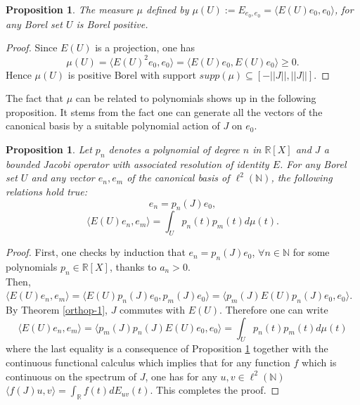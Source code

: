 \documentclass[a4paper]{jpconf}
\numberwithin{equation}{section}
\newtheorem{proposition}[Theorem]{Proposition}
\theoremstyle{nonumberplain}
\newtheorem{proof}{Proof}
\begin{document}
\begin{proposition}\label{measure-proba}
The measure $\mu$ defined by $\mu(U):=E_{e_0,e_0}=\langle E(U)e_0,e_0 \rangle$, for any Borel set $U$ is Borel positive.
\end{proposition}
\begin{proof}
Since $E(U)$ is a projection, one has 
\begin{equation}
\mu(U)=\langle E(U)^2e_0,e_0  \rangle=\langle E(U)e_0,E(U)e_0\rangle\ge0. 
\end{equation}
Hence $\mu(U)$ is positive Borel with support $supp(\mu)\subseteq[-||J||,||J||]$. 
\end{proof}
The fact that $\mu$ can be related to polynomials shows up in the following proposition. It stems from the fact one can generate all the vectors of the canonical basis by a suitable polynomial action of $J$ on $e_0$.
\begin{proposition}\label{matrixelem-spectral-meas}
Let $p_n$ denotes a polynomial of degree $n$ in $\mathbb{R}[X]$ and $J$ a bounded Jacobi operator with associated resolution of identity $E$. For any Borel set $U$ and any vector $e_n,e_m$ of the canonical basis of $\ell^2(\mathbb{N})$, the following relations hold true:
\begin{equation}
e_n=p_n(J)e_0,
\end{equation}
\begin{equation}
\langle E(U)e_n,e_m \rangle=\int_{U}p_n(t)p_m(t)d\mu(t).
\end{equation}
\end{proposition}
\begin{proof}
First, one checks by induction that $e_n=p_n(J)e_0$, $\forall n\in\mathbb{N}$ for some polynomials $p_n\in\mathbb{R}[X]$, thanks to $a_n>0$. \\
Then, $\langle E(U)e_n,e_m \rangle=\langle E(U)p_n(J)e_0,p_m(J)e_0\rangle=\langle p_m(J)E(U)p_n(J)e_0,e_0\rangle$. By Theorem \ref{orthop-1}, $J$ commutes with $E(U)$. Therefore one can write 
\begin{equation}
\langle E(U)e_n,e_m \rangle=\langle p_m(J)p_n(J)E(U)e_0,e_0\rangle=\int_{U}p_n(t)p_m(t)d\mu(t)
\end{equation}
where the last equality is a consequence of Proposition \ref{measure-proba} together with the continuous functional calculus which implies that for any function $f$ which is continuous on the spectrum of $J$, one has for any $u,v\in\ell^2(\mathbb{N})$ $\langle f(J)u,v\rangle=\int_\mathbb{R}f(t)dE_{uv}(t)$. This completes the proof.
\end{proof}
\end{document}
